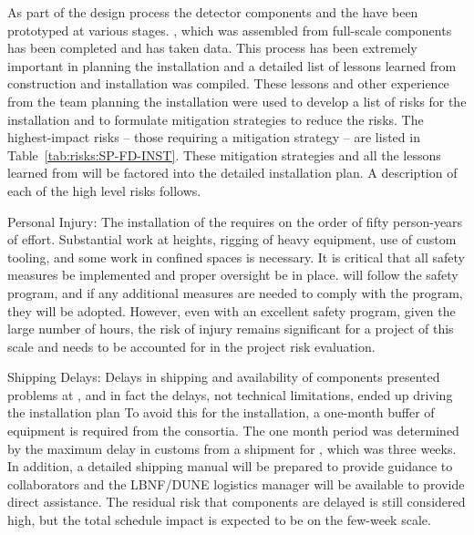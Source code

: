 As part of the  design process the detector components and the  have been prototyped at various stages. , which was assembled from full-scale %
components has %
been completed and has taken data. 
This process has been extremely important in planning the  %
installation and a detailed list of lessons learned from  construction and installation was compiled\cite{bib:docdb8255}. 
These lessons %
and other experience from the team planning the installation were used to develop a list of %
risks for the %
 installation and to formulate mitigation strategies to reduce the risks.
The highest-impact risks -- those requiring a mitigation strategy -- are listed in Table~\ref{tab:risks:SP-FD-INST}. 
These mitigation strategies and all the lessons learned from  will be factored into the detailed installation plan. A description of each of the high level risks follows.



Personal Injury:
The installation of the  requires on the order of fifty person-years of effort. Substantial work at heights, rigging of heavy equipment, use of custom tooling, and some work in confined spaces is necessary. It is critical that all safety measures be implemented and proper oversight be in place. %
 will follow the  safety program, and if any additional measures are needed to comply with the  program, they will be adopted. However, even with an  excellent safety program, %
 given the large number of hours, the risk of injury remains significant for a project of this scale and needs to be accounted for in the project risk evaluation.

Shipping Delays:
Delays in shipping and availability of components %
presented problems at , and in fact the delays, not technical limitations, ended up driving %
the installation plan %
To avoid this for the  installation, a one-month buffer of equipment is required from the consortia. The one month period was determined by the maximum delay in customs from a shipment for  , which was three weeks. In addition, a detailed shipping manual will be prepared to provide guidance to collaborators and the LBNF/DUNE logistics manager will be available to provide direct assistance. The residual risk that components are delayed is still considered high, but the total schedule impact is expected to be on the few-week scale.

